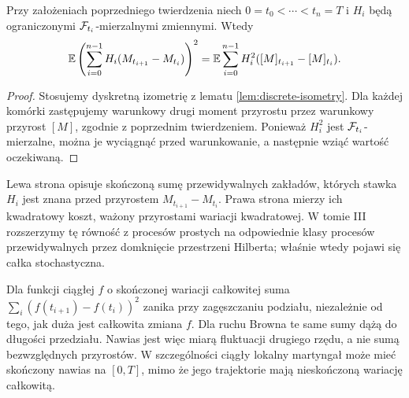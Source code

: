 \begin{wniosek}
Przy założeniach poprzedniego twierdzenia niech
$0=t_0<\cdots<t_n=T$ i $H_i$ będą ograniczonymi
$\mathcal{F}_{t_i}$-mierzalnymi zmiennymi. Wtedy
\[
\mathbb{E}\left(\sum_{i=0}^{n-1}H_i(M_{t_{i+1}}-M_{t_i})\right)^2
=\mathbb{E}\sum_{i=0}^{n-1}H_i^2
([M]_{t_{i+1}}-[M]_{t_i}).
\]
\end{wniosek}
\begin{proof}
Stosujemy dyskretną izometrię z lematu
\ref{lem:discrete-isometry}. Dla każdej komórki
zastępujemy warunkowy drugi moment przyrostu przez
warunkowy przyrost $[M]$, zgodnie z poprzednim
twierdzeniem. Ponieważ $H_i^2$ jest
$\mathcal{F}_{t_i}$-mierzalne, można je wyciągnąć przed
warunkowanie, a następnie wziąć wartość oczekiwaną.
\end{proof}

\begin{uwaga}
Lewa strona opisuje skończoną sumę przewidywalnych
zakładów, których stawka $H_i$ jest znana przed
przyrostem $M_{t_{i+1}}-M_{t_i}$. Prawa strona
mierzy ich kwadratowy koszt, ważony przyrostami
wariacji kwadratowej. W tomie III rozszerzymy tę
równość z procesów prostych na odpowiednie klasy
procesów przewidywalnych przez domknięcie przestrzeni
Hilberta; właśnie wtedy pojawi się całka stochastyczna.
\end{uwaga}

\begin{uwaga}
Dla funkcji ciągłej $f$ o skończonej wariacji całkowitej
suma $\sum_i(f(t_{i+1})-f(t_i))^2$ zanika przy
zagęszczaniu podziału, niezależnie od tego, jak duża
jest całkowita zmiana $f$. Dla ruchu Browna te same
sumy dążą do długości przedziału. Nawias jest więc
miarą fluktuacji drugiego rzędu, a nie sumą bezwzględnych
przyrostów. W szczególności ciągły lokalny martyngał
może mieć skończony nawias na $[0,T]$, mimo że jego
trajektorie mają nieskończoną wariację całkowitą.
\end{uwaga}

